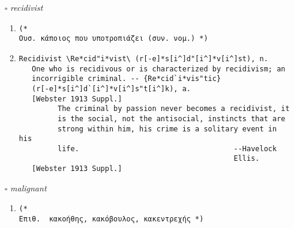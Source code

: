 \documentclass{article}
\begin{document}
\begin{itemize}
\begin{enumerate}
{\begin{lstlisting}
            God set before him a mortal and immortal life, a
            nature celestial and terrene.         --Sir W.
                                                  Raleigh.
      [1913 Webster]
            Be true and faithful to the king and his heirs, and
            truth and faith to bear of life and limb, and
            terrene honor.                        --O. Eng. Oath
                                                  of Allegiance,
                                                  quoted by
                                                  Blackstone.
      [1913 Webster]
            Common conceptions of the matters which lie at the
            basis of our terrene experience.      --Hickok.
      [1913 Webster]
Terrene \Ter*rene"\, n. [L. terrenum land, ground: cf. F.
   terrain.]
   1. The earth's surface; the earth. [Poetic]
      [1913 Webster]
            Tenfold the length of this terrene.   --Milton.
      [1913 Webster]
   2. (Surv.) The surface of the ground.
      [1913 Webster]
\end{lstlisting}}
\end{enumerate}
\item[$\square$] \emph{ recidivist }
\begin{enumerate}
\item{
\begin{lstlisting}
(* 
Ουσ. κάποιος που υποτροπιάζει (συν. νομ.) *)
\end{lstlisting}}
\item{
\begin{lstlisting}
Recidivist \Re*cid"i*vist\ (r[-e]*s[i^]d"[i^]*v[i^]st), n.
   One who is recidivous or is characterized by recidivism; an
   incorrigible criminal. -- {Re*cid`i*vis"tic}
   (r[-e]*s[i^]d`[i^]*v[i^]s"t[i^]k), a.
   [Webster 1913 Suppl.]
         The criminal by passion never becomes a recidivist, it
         is the social, not the antisocial, instincts that are
         strong within him, his crime is a solitary event in his
         life.                                    --Havelock
                                                  Ellis.
   [Webster 1913 Suppl.]
\end{lstlisting}}
\end{enumerate}
\item[$\square$] \emph{ malignant }
\begin{enumerate}
\item{
\begin{lstlisting}
(* 
Επιθ.  κακοήθης, κακόβουλος, κακεντρεχής *)
\end{lstlisting}}

\end{enumerate}
\end{itemize}
\end{document}
